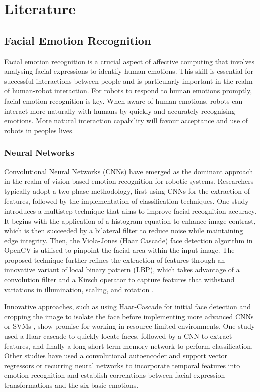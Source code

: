 \chapter{Literature}

\section{Facial Emotion Recognition}

Facial emotion recognition is a crucial aspect of affective computing \cite{Picard2000-mt} that involves analysing facial expressions to identify human emotions. This skill is essential for successful interactions between people and is particularly important in the realm of human-robot interaction. For robots to respond to human emotions promptly, facial emotion recognition is key. When aware of human emotions, robots can interact more naturally with humans by quickly and accurately recognising emotions. More natural interaction capability will favour acceptance and use of robots in peoples lives.

\subsection{Neural Networks}

Convolutional Neural Networks (CNNs) have emerged as the dominant approach in the realm of vision-based emotion recognition for robotic systems. Researchers typically adopt a two-phase methodology, first using CNNs for the extraction of features, followed by the implementation of classification techniques. One study introduces a multistep technique that aims to improve facial recognition accuracy. It begins with the application of a histogram equation to enhance image contrast, which is then succeeded by a bilateral filter to reduce noise while maintaining edge integrity. Then, the Viola-Jones (Haar Cascade) face detection algorithm in OpenCV is utilised to pinpoint the facial area within the input image. The proposed technique further refines the extraction of features through an innovative variant of local binary pattern (LBP), which takes advantage of a convolution filter and a Kirsch operator to capture features that withstand variations in illumination, scaling, and rotation \cite{Mistry2020-gr}.

Innovative approaches, such as using Haar-Cascade for initial face detection and cropping the image to isolate the face before implementing more advanced CNNs \cite{Appuhamy2018-dc} or SVMs \cite{Gupta2018-af} \cite{Rosula_Reyes2020-yz}, show promise for working in resource-limited environments. One study used a Haar cascade to quickly locate faces, followed by a CNN to extract features, and finally a long-short-term memory network \cite{8760246} to perform classification. Other studies have used a convolutional autoencoder and support vector regressors \cite{Allognon2020-um} or recurring neural networks \cite{Brandizzi2021AutomaticRI} to incorporate temporal features into emotion recognition and establish correlations between facial expression transformations and the six basic emotions.

